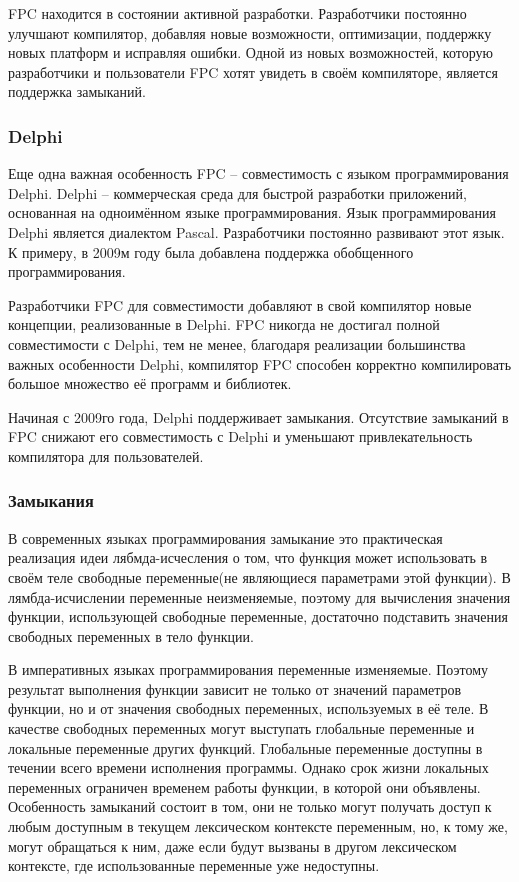 \documentclass{imcs}
\begin{document}
FPC находится в состоянии активной разработки. Разработчики постоянно улучшают компилятор,
добавляя новые возможности, оптимизации, поддержку новых платформ и
исправляя ошибки\cite{fpc}.
Одной из новых возможностей, которую разработчики и пользователи FPC хотят увидеть в
своём компиляторе, является поддержка замыканий.

\subsubsection{Delphi}

Еще одна важная особенность FPC -- совместимость с языком программирования Delphi.
Delphi -- коммерческая среда для быстрой разработки приложений, основанная на одноимённом
языке программирования. Язык программирования Delphi является диалектом Pascal. 
Разработчики постоянно развивают этот язык. К примеру, в 2009м году была добавлена 
поддержка обобщенного программирования.

Разработчики FPC для совместимости добавляют в свой компилятор новые концепции, реализованные
в Delphi. FPC никогда не достигал полной совместимости с Delphi, тем не менее, благодаря
реализации большинства важных особенности Delphi, компилятор FPC способен корректно компилировать
большое множество её программ и библиотек.

Начиная с 2009го года, Delphi поддерживает замыкания\cite{delphichange}. Отсутствие замыканий в FPC
снижают его совместимость с Delphi и уменьшают привлекательность компилятора для пользователей.

\subsubsection{Замыкания}
В современных языках программирования замыкание это практическая реализация
идеи лябмда-исчесления о том, что функция может использовать в своём теле свободные
переменные(не являющиеся параметрами этой функции). В лямбда-исчислении
переменные неизменяемые, поэтому для вычисления значения функции, использующей
свободные переменные, достаточно подставить значения свободных переменных в тело
функции\cite{lambdatutor}.

В императивных языках программирования переменные изменяемые.
Поэтому результат выполнения функции зависит не только от значений параметров
функции, но и от значения свободных переменных, используемых в её теле. В качестве
свободных переменных могут выступать глобальные переменные и локальные переменные
других функций. Глобальные переменные доступны в течении всего времени исполнения программы.
Однако срок жизни
локальных переменных ограничен временем работы функции, в которой они объявлены.
Особенность замыканий состоит в том, они не только могут получать доступ к любым
доступным в текущем лексическом контексте переменным, но, к тому же, могут
обращаться к ним, даже если будут вызваны в другом лексическом контексте, где
использованные переменные уже недоступны.
\end{document}
